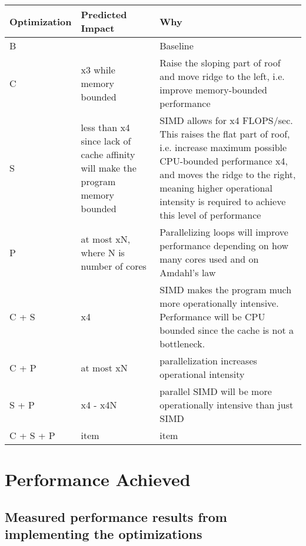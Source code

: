 \documentclass{article} \usepackage[utf8]{inputenc}
\begin{document}
\begin{tabularx}{0.8\textwidth} {
  | >{\centering\arraybackslash}X
  | >{\centering\arraybackslash}X
  | >{\centering\arraybackslash}X | }
\hline
Optimization & Predicted Impact & Why \\
\hline

B  & 1.0  & Baseline  \\
\hline
C  & x3 while memory bounded & Raise the sloping part of roof and move ridge to the left, i.e. improve memory-bounded performance  \\
\hline
S  & less than x4 since lack of cache affinity will make the program memory bounded & SIMD allows for x4 FLOPS/sec. This raises the flat part of roof, i.e. increase maximum possible CPU-bounded performance x4, and moves the ridge to the right, meaning higher operational intensity is required to achieve this level of performance \\
\hline
P  &  at most xN, where N is number of cores  & Parallelizing loops will improve performance depending on how many cores used and on Amdahl's law \\
\hline
C + S  & x4  & SIMD makes the program much more operationally intensive. Performance will be CPU bounded since the cache is not a bottleneck.   \\
\hline
C + P  & at most xN  & parallelization increases operational intensity \\
\hline
S + P  & x4 - x4N  & parallel SIMD will be more operationally intensive than just SIMD  \\
\hline
C + S + P  & item  & item  \\
\hline


\end{tabularx}


\section{Performance Achieved}

\subsection{Measured performance results from implementing the
  optimizations}
\end{document}
